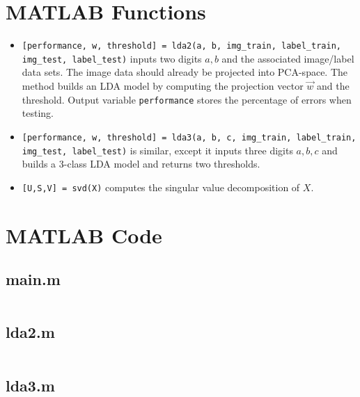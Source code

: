 \documentclass{article}
\begin{document}
\begin{appendices}

\section{MATLAB Functions}

\begin{itemize}
    \item \texttt{[performance, w, threshold] = lda2(a, b, img\_train, label\_train, img\_test, label\_test)} inputs two digits $a,b$ and the associated image/label data sets. The image data should already be projected into PCA-space. The method builds an LDA model by computing the projection vector $\vec{w}$ and the threshold. Output variable \texttt{performance} stores the percentage of errors when testing.
    
    \item \texttt{[performance, w, threshold] = lda3(a, b, c, img\_train, label\_train, img\_test, label\_test)} is similar, except it inputs three digits $a,b,c$ and builds a 3-class LDA model and returns two thresholds.
    
    \item \texttt{[U,S,V] = svd(X)} computes the singular value decomposition of $X$.
\end{itemize}

\section{MATLAB Code}

\subsection{main.m}
\inputminted{matlab}{main.m}

\subsection{lda2.m}
\inputminted{matlab}{lda2.m}


\subsection{lda3.m}
\inputminted{matlab}{lda3.m}
\end{appendices}
\end{document}
